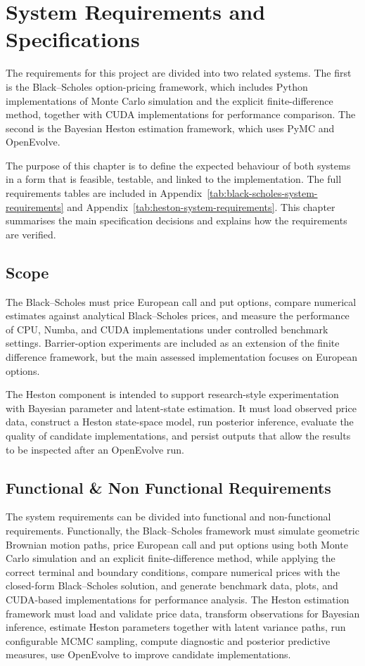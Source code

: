 \documentclass[11pt]{report}
\begin{document}
\chapter{System Requirements and Specifications}\label{ch:6}
The requirements for this project are divided into two related systems.
The first is the Black--Scholes option-pricing framework, which includes
Python implementations of Monte Carlo simulation and the explicit
finite-difference method, together with CUDA implementations for
performance comparison. The second is the Bayesian Heston estimation
framework, which uses PyMC and OpenEvolve.

The purpose of this chapter is to define the expected behaviour of both
systems in a form that is feasible, testable, and linked to the
implementation. The full requirements tables are included in
Appendix~\ref{tab:black-scholes-system-requirements} and
Appendix~\ref{tab:heston-system-requirements}. This chapter summarises the
main specification decisions and explains how the requirements are verified.

\section{Scope}
The Black--Scholes must price European call and put options, compare numerical estimates
against analytical Black--Scholes prices, and measure the performance of
CPU, Numba, and CUDA implementations under controlled benchmark settings.
Barrier-option experiments are included as an extension of the finite
difference framework, but the main assessed implementation focuses on
European options.

The Heston component is intended to support research-style experimentation
with Bayesian parameter and latent-state estimation. It must load observed
price data, construct a Heston state-space model, run posterior inference,
evaluate the quality of candidate implementations, and persist outputs that
allow the results to be inspected after an OpenEvolve run.

\section{Functional \& Non Functional Requirements}
The system requirements can be divided into functional and non-functional requirements.
Functionally, the Black--Scholes framework must simulate geometric Brownian motion paths,
price European call and put options using both Monte Carlo simulation and 
an explicit finite-difference method, while applying the
correct terminal and boundary conditions,
compare numerical prices with the 
closed-form Black--Scholes solution, 
and generate benchmark data, plots, 
and CUDA-based implementations for 
performance analysis. 
The Heston estimation 
framework must load and validate price data, 
transform observations for Bayesian inference, 
estimate Heston parameters together with latent variance paths, 
run configurable MCMC sampling, compute diagnostic and posterior predictive measures, 
use OpenEvolve to improve candidate implementations.
\end{document}
